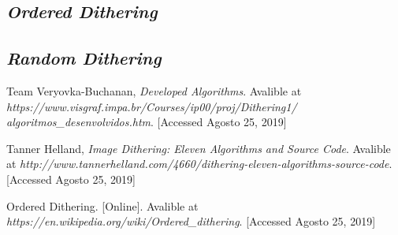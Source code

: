 \documentclass[conference]{IEEEtran}
\begin{document}
\subsection{\textit{Ordered Dithering}}
\textcolor{violet}{\lipsum[3]}

\subsection{\textit{Random Dithering}}
\textcolor{violet}{\lipsum[3]}








\begin{thebibliography}{00}
 Team Veryovka-Buchanan, \textit{Developed Algorithms}. Avalible at \textit{https://www.visgraf.impa.br/Courses/ip00/proj/Dithering1/\\algoritmos\_desenvolvidos.htm}. [Accessed Agosto 25, 2019]

 Tanner Helland, \textit{Image Dithering: Eleven Algorithms and Source Code}. Avalible at \textit{http://www.tannerhelland.com/4660/dithering-eleven-algorithms-source-code}. [Accessed Agosto 25, 2019]

 Ordered Dithering. [Online]. Avalible at \textit{https://en.wikipedia.org/wiki/Ordered\_dithering}. [Accessed Agosto 25, 2019]
\end{thebibliography}


\end{document}
